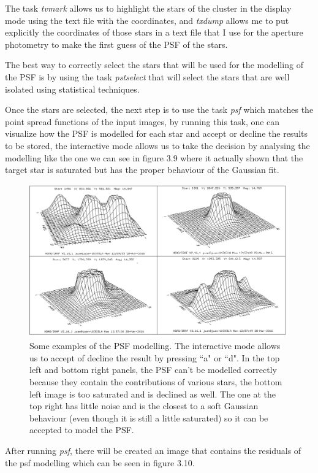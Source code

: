 The task \textit{tvmark} allows us to highlight the stars of the cluster in the display mode using the text file with the coordinates, and \textit{txdump} allows me to  put explicitly the coordinates of those stars in a text file that I use for the aperture photometry to make the first guess of the PSF of the stars.

The best way to correctly select the stars that will be used for the modelling of the PSF is by using the task \textit{pstselect} that will select the stars that are well isolated using statistical techniques. 

Once the stars are selected, the next step is to use the task \textit{psf} which matches the point spread functions of the input images, by running this task, one can visualize how the PSF is modelled for each star and accept or decline the results to be stored, the interactive mode allows us to take the decision by analysing the modelling like the one we can see in figure 3.9 where it actually shown that the target star is saturated but has the proper behaviour of the Gaussian fit.

\begin{figure}[H]
\centering
\includegraphics[width=12cm]{images/psf.png}
\caption[PSF modelling]{Some examples of the PSF modelling. The interactive mode allows us to accept of decline the result by pressing ``a" or ``d". In the top left and bottom right panels, the PSF can't be modelled correctly because they contain the contributions of various stars, the bottom left image is too saturated and is declined as well. The one at the top right has little noise and is the closest to a soft Gaussian behaviour (even though it is still a little saturated) so it can be accepted to model the PSF.}
\end{figure}

After running \textit{psf}, there will be created an image that contains the residuals of the psf modelling which can be seen in figure 3.10.

